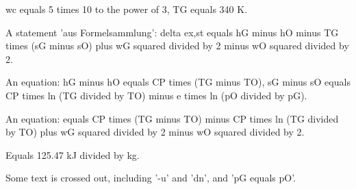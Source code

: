 wc equals 5 times 10 to the power of 3, TG equals 340 K. 

A statement 'aus Formelsammlung': delta ex,st equals hG minus hO minus TG times (sG minus sO) plus wG squared divided by 2 minus wO squared divided by 2. 

An equation: hG minus hO equals CP times (TG minus TO), sG minus sO equals CP times ln (TG divided by TO) minus e times ln (pO divided by pG). 

An equation: equals CP times (TG minus TO) minus CP times ln (TG divided by TO) plus wG squared divided by 2 minus wO squared divided by 2. 

Equals 125.47 kJ divided by kg. 

Some text is crossed out, including '-u' and 'dn', and 'pG equals pO'.